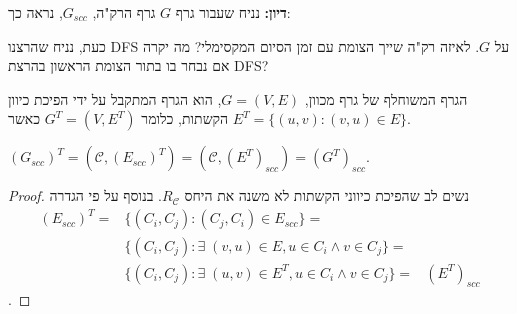 \textbf{דיון:}
נניח שעבור גרף $G$ גרף הרק"ה,
$G_{scc}$,
נראה כך:
\begin{center}
\end{center}
כעת, נניח שהרצנו
\textenglish{DFS}
על $G$.
לאיזה רק"ה שייך הצומת עם זמן הסיום המקסימלי? 
מה יקרה אם נבחר בו בתור הצומת הראשון בהרצת
\textenglish{DFS}?


\begin{definition}
הגרף המשוחלף של גרף מכוון,
$G = (V, E)$,
הוא הגרף המתקבל על ידי הפיכת כיוון הקשתות, כלומר
$G^T = (V, E^T)$
כאשר
$E^T = \{(u, v) : (v, u) \in E\}$.
\end{definition}

\begin{claim}
$(G_{scc})^T = (\mathcal{C}, (E_{scc})^T) = (\mathcal{C}, (E^T)_{scc}) = (G^T)_{scc}$.
\end{claim}

\begin{proof}
נשים לב שהפיכת כיווני הקשתות לא משנה את היחס
$R_\mathcal{C}$.
בנוסף על פי הגדרה
$$
\begin{array}{lll}
(E_{scc})^T = 
&
\{(C_i, C_j) : (C_j, C_i) \in E_{scc}\} =
\\&
\{(C_i, C_j) : \exists\;(v, u) \in E,  u \in C_i \land v \in C_j\} =
\\&
\{(C_i, C_j) : \exists\;(u, v) \in E^T, u \in C_i \land v \in C_j\} =
&
(E^T)_{scc}
\end{array}
$$
.
\end{proof}

